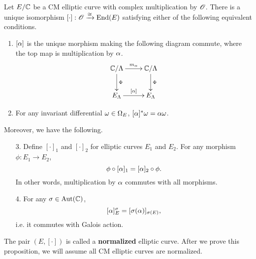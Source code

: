\begin{pr}
Let $E/\mathbb{C}$ be a CM elliptic curve with complex multiplication by $\mathscr{O}$. There is a unique isomorphism $[\cdot]:\mathscr{O}\xrightarrow{\cong}\operatorname{End}(E)$ 
satisfying either of the following equivalent conditions.
\begin{enumerate}
\item
$[\alpha]$ is the unique morphism making the following diagram commute, where the top map is multiplication by $\alpha$.
\[\xymatrix{
\C/\La\ar[r]^{m_{\al}}\ar[d]^{\Phi} & \C/\La\ar[d]^{\Phi}\\
E_{\La}\ar[r]^{[\al]}& E_{\La}
}\]
\item For any invariant differential $\omega\in \Omega_E$, $[\alpha]^*\omega=\alpha\omega$.
\end{enumerate}
Moreover, we have the following.
\begin{enumerate}
\item[3.]
Define $[\cdot]_1$ and $[\cdot]_2$ for elliptic curves $E_1$ and $E_2$. For any morphism $\phi:E_1\to E_2$,
\[
\phi\circ [\alpha]_{1}=[\alpha]_{2}\circ \phi.
\]
In other words, multiplication by $\alpha$ commutes with all morphisms.
\item[4.] For any $\sigma\in \operatorname{Aut}(\mathbb{C})$,
\[
[\alpha]_E^{\sigma}=[\sigma(\alpha)]_{\sigma(E)},
\]
i.e. it commutes with Galois action.
\end{enumerate}
\end{pr}
The pair $(E,[\cdot])$ is called a \textbf{normalized} elliptic curve. After we prove this proposition, we will assume all CM elliptic curves are normalized.
